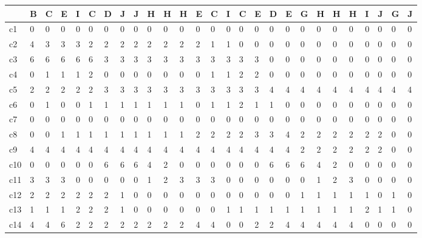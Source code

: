 \documentclass{article}
\begin{document}
\begin{table}[H]
\begin{tabular}{|l|llllllllllllllllllllllllll|}
    \hline
~   & B & C & E & I & C & D & J & J & H & H & H & E & C & I & C & E & D & E & G & H & H & H & I & J & G & J \\ \hline
c1  & 0 & 0 & 0 & 0 & 0 & 0 & 0 & 0 & 0 & 0 & 0 & 0 & 0 & 0 & 0 & 0 & 0 & 0 & 0 & 0 & 0 & 0 & 0 & 0 & 0 & 0 \\
c2  & 4 & 3 & 3 & 3 & 2 & 2 & 2 & 2 & 2 & 2 & 2 & 2 & 1 & 1 & 0 & 0 & 0 & 0 & 0 & 0 & 0 & 0 & 0 & 0 & 0 & 0 \\
c3  & 6 & 6 & 6 & 6 & 6 & 3 & 3 & 3 & 3 & 3 & 3 & 3 & 3 & 3 & 3 & 3 & 0 & 0 & 0 & 0 & 0 & 0 & 0 & 0 & 0 & 0 \\
c4  & 0 & 1 & 1 & 1 & 2 & 0 & 0 & 0 & 0 & 0 & 0 & 0 & 1 & 1 & 2 & 2 & 0 & 0 & 0 & 0 & 0 & 0 & 0 & 0 & 0 & 0 \\
c5  & 2 & 2 & 2 & 2 & 2 & 3 & 3 & 3 & 3 & 3 & 3 & 3 & 3 & 3 & 3 & 3 & 4 & 4 & 4 & 4 & 4 & 4 & 4 & 4 & 4 & 4 \\
c6  & 0 & 1 & 0 & 0 & 1 & 1 & 1 & 1 & 1 & 1 & 1 & 0 & 1 & 1 & 2 & 1 & 1 & 0 & 0 & 0 & 0 & 0 & 0 & 0 & 0 & 0 \\
c7  & 0 & 0 & 0 & 0 & 0 & 0 & 0 & 0 & 0 & 0 & 0 & 0 & 0 & 0 & 0 & 0 & 0 & 0 & 0 & 0 & 0 & 0 & 0 & 0 & 0 & 0 \\
c8  & 0 & 0 & 1 & 1 & 1 & 1 & 1 & 1 & 1 & 1 & 1 & 2 & 2 & 2 & 2 & 3 & 3 & 4 & 2 & 2 & 2 & 2 & 2 & 2 & 0 & 0 \\
c9  & 4 & 4 & 4 & 4 & 4 & 4 & 4 & 4 & 4 & 4 & 4 & 4 & 4 & 4 & 4 & 4 & 4 & 4 & 2 & 2 & 2 & 2 & 2 & 2 & 0 & 0 \\
c10 & 0 & 0 & 0 & 0 & 0 & 6 & 6 & 6 & 4 & 2 & 0 & 0 & 0 & 0 & 0 & 0 & 6 & 6 & 6 & 4 & 2 & 0 & 0 & 0 & 0 & 0 \\
c11 & 3 & 3 & 3 & 0 & 0 & 0 & 0 & 0 & 1 & 2 & 3 & 3 & 3 & 0 & 0 & 0 & 0 & 0 & 0 & 1 & 2 & 3 & 0 & 0 & 0 & 0 \\
c12 & 2 & 2 & 2 & 2 & 2 & 2 & 1 & 0 & 0 & 0 & 0 & 0 & 0 & 0 & 0 & 0 & 0 & 0 & 1 & 1 & 1 & 1 & 1 & 0 & 1 & 0 \\
c13 & 1 & 1 & 1 & 2 & 2 & 2 & 1 & 0 & 0 & 0 & 0 & 0 & 0 & 1 & 1 & 1 & 1 & 1 & 1 & 1 & 1 & 1 & 2 & 1 & 1 & 0 \\
c14 & 4 & 4 & 6 & 2 & 2 & 2 & 2 & 2 & 2 & 2 & 2 & 4 & 4 & 0 & 0 & 2 & 2 & 4 & 4 & 4 & 4 & 4 & 0 & 0 & 0 & 0 \\ \hline 
\end{tabular}
\end{table}
\end{document}
